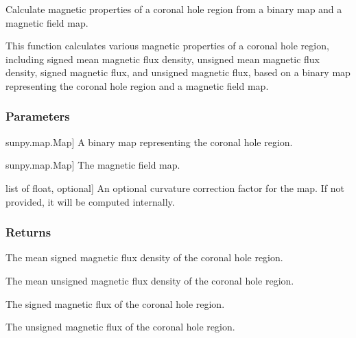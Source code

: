 \documentclass[letterpaper,10pt,english]{sphinxmanual}
\begin{document}
\begin{fulllineitems}
\label{\detokenize{pycatch/utils/ch_mapping:pycatch.utils.ch_mapping.ch_flux}}
\pysigstartsignatures
{}
\pysigstopsignatures
\sphinxAtStartPar
Calculate magnetic properties of a coronal hole region from a binary map and a magnetic field map.

\sphinxAtStartPar
This function calculates various magnetic properties of a coronal hole region, including signed mean magnetic flux density, unsigned mean magnetic flux density, signed magnetic flux, and unsigned magnetic flux, based on a binary map representing the coronal hole region and a magnetic field map.


\subsubsection{Parameters}
\label{\detokenize{pycatch/utils/ch_mapping:id9}}\begin{description}
\sphinxlineitem{binmap}{[}sunpy.map.Map{]}
\sphinxAtStartPar
A binary map representing the coronal hole region.

\sphinxlineitem{magmap}{[}sunpy.map.Map{]}
\sphinxAtStartPar
The magnetic field map.

\sphinxlineitem{coreg}{[}list of float, optional{]}
\sphinxAtStartPar
An optional curvature correction factor for the map. If not provided, it will be computed internally.

\end{description}


\subsubsection{Returns}
\label{\detokenize{pycatch/utils/ch_mapping:id10}}\begin{description}
\sphinxAtStartPar
The mean signed magnetic flux density of the coronal hole region.

\sphinxAtStartPar
The mean unsigned magnetic flux density of the coronal hole region.

\sphinxAtStartPar
The signed magnetic flux of the coronal hole region.

\sphinxAtStartPar
The unsigned magnetic flux of the coronal hole region.

\end{description}

\end{fulllineitems}
\end{document}

